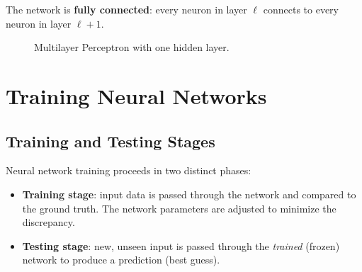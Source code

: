 \documentclass[11pt,a4paper]{article}
\theoremstyle{definition}
\theoremstyle{plain}
\theoremstyle{remark}
\begin{document}
The network is \textbf{fully connected}: every neuron in layer $\ell$ connects to every neuron in layer $\ell+1$.

\begin{figure}[h]
    \centering
    \caption{Multilayer Perceptron with one hidden layer.}\label{fig:mlp}
\end{figure}


\section{Training Neural Networks}

\subsection{Training and Testing Stages}

Neural network training proceeds in two distinct phases:
\begin{itemize}
    \item \textbf{Training stage}: input data is passed through the network and compared to the ground truth. The network parameters are adjusted to minimize the discrepancy.
    \item \textbf{Testing stage}: new, unseen input is passed through the \textit{trained} (frozen) network to produce a prediction (best guess).
\end{itemize}
\end{document}
